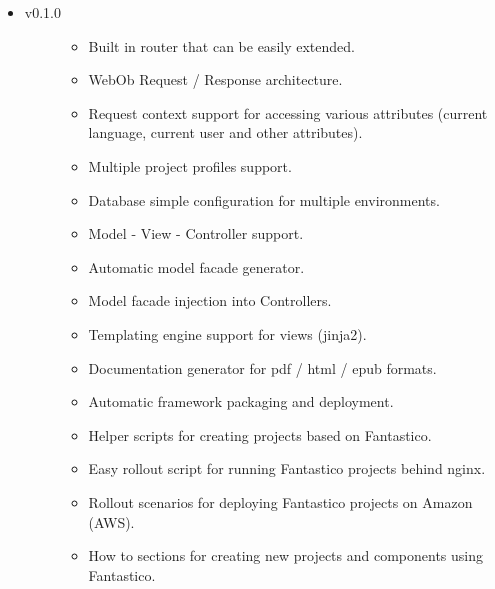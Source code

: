 \documentclass[letterpaper,10pt,english]{sphinxmanual}
\begin{document}
\begin{itemize}
\begin{description}
\end{description}

\item {} \begin{description}
\item[{v0.1.0}] \leavevmode\begin{itemize}
\item {} 
Built in router that can be easily extended.

\item {} 
WebOb Request / Response architecture.

\item {} 
Request context support for accessing various attributes (current language, current user and other attributes).

\item {} 
Multiple project profiles support.

\item {} 
Database simple configuration for multiple environments.

\item {} 
Model - View - Controller support.

\item {} 
Automatic model facade generator.

\item {} 
Model facade injection into Controllers.

\item {} 
Templating engine support for views (jinja2).

\item {} 
Documentation generator for pdf / html / epub formats.

\item {} 
Automatic framework packaging and deployment.

\item {} 
Helper scripts for creating projects based on Fantastico.

\item {} 
Easy rollout script for running Fantastico projects behind nginx.

\item {} 
Rollout scenarios for deploying Fantastico projects on Amazon (AWS).

\item {} 
How to sections for creating new projects and components using Fantastico.

\end{itemize}

\end{description}

\end{itemize}
\end{document}
